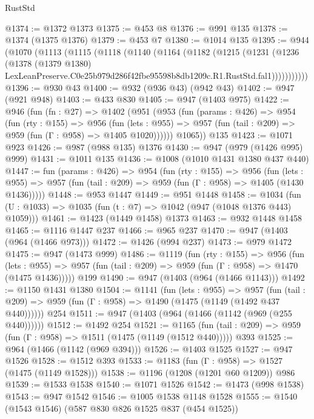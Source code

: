 \begin{lexlean}{RustStd}
\begin{coremodule}
@1374 := @1372 @1373
@1375 := @453 @8
@1376 := @991 @135
@1378 := @1374 (@1375 @1376)
@1379 := @453 @7
@1380 := @1014 @135
@1395 := @944
    (@1070
      (@1113
        (@1115
          (@1118
            (@1140
              (@1164
                (@1182
                  (@1215
                    (@1231
                      (@1236
                        (@1378
                          (@1379 @1380)
                          LexLeanPreserve.C0e25b979d286f42fbe95598b8db1209c.R1.RustStd.fal1)))))))))))
@1396 := @930 @43
@1400 := @932 (@936 @43) (@942 @43)
@1402 := @947 (@921 @948)
@1403 := @433 @830
@1405 := @947 (@1403 @975)
@1422 := @946
    (fun (fn : @27) =>
    @1402
      (@951
        (@953
          (fun (params : @426) =>
          @954
            (fun (rty : @155) =>
            @956
              (fun (lets : @955) =>
              @957 (fun (tail : @209) => @959 (fun (Γ : @958) => @1405 @1020))))))
        @1065))
    @135
@1423 := @1071 @923
@1426 := @987 (@988 @135) @1376
@1430 := @947 (@979 (@1426 @995) @999)
@1431 := @1011 @135
@1436 := @1008 (@1010 @1431 @1380 @437 @440)
@1447 := fun (params : @426) =>
  @954
    (fun (rty : @155) =>
    @956
      (fun (lets : @955) =>
      @957 (fun (tail : @209) => @959 (fun (Γ : @958) => @1405 (@1430 @1436)))))
@1448 := @953 @1447
@1449 := @951 @1448
@1458 := @1034 (fun (U : @1033) => @1035 (fun (t : @7) => @1042 (@947 (@1048 @1376 @443) @1059)))
@1461 := @1423 (@1449 @1458) @1373
@1463 := @932 @1448 @1458
@1465 := @1116 @1447 @237
@1466 := @965 @237
@1470 := @947 (@1403 (@964 (@1466 @973)))
@1472 := @1426 (@994 @237)
@1473 := @979 @1472
@1475 := @947 (@1473 @999)
@1486 := @1119
    (fun (rty : @155) =>
    @956
      (fun (lets : @955) =>
      @957 (fun (tail : @209) => @959 (fun (Γ : @958) => @1470 (@1475 @1436)))))
    @199
@1490 := @947 (@1403 (@964 (@1466 @1143)))
@1492 := @1150 @1431 @1380
@1504 := @1141
    (fun (lets : @955) =>
    @957 (fun (tail : @209) => @959 (fun (Γ : @958) => @1490 (@1475 (@1149 (@1492 @437 @440))))))
    @254
@1511 := @947 (@1403 (@964 (@1466 (@1142 (@969 (@255 @440))))))
@1512 := @1492 @254
@1521 := @1165
    (fun (tail : @209) => @959 (fun (Γ : @958) => @1511 (@1475 (@1149 (@1512 @440)))))
    @393
@1525 := @964 (@1466 (@1142 (@969 @394)))
@1526 := @1403 @1525
@1527 := @947 @1526
@1528 := @1512 @393
@1533 := @1183 (fun (Γ : @958) => @1527 (@1475 (@1149 @1528)))
@1538 := @1196 (@1208 (@1201 @60 @1209)) @986
@1539 := @1533 @1538
@1540 := @1071 @1526
@1542 := @1473 (@998 @1538)
@1543 := @947 @1542
@1546 := @1005 @1538 @1148 @1528
@1555 := @1540 (@1543 @1546) (@587 @830 @826 @1525 @837 (@454 @1525))

\end{coremodule}
\end{lexlean}
